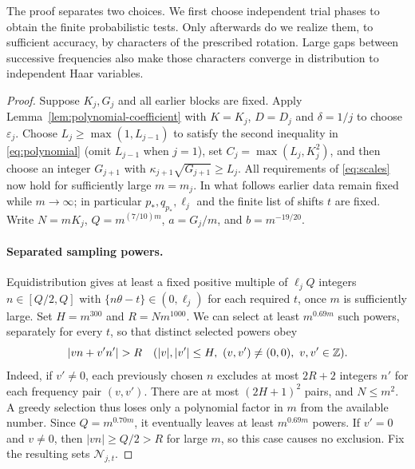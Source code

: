 The proof separates two choices.  We first choose independent trial
phases to obtain the finite probabilistic tests.  Only afterwards do
we realize them, to sufficient accuracy, by characters of the prescribed
rotation.  Large gaps between successive frequencies also make those
characters converge in distribution to independent Haar variables.

\begin{proof}
Suppose $K_j,G_j$ and all earlier blocks are fixed.  Apply
Lemma~\ref{lem:polynomial-coefficient} with $K=K_j$, $D=D_j$ and
$\delta=1/j$ to choose $\varepsilon_j$.
Choose $L_j\ge\max(1,L_{j-1})$ to satisfy the second inequality in \eqref{eq:polynomial}
(omit $L_{j-1}$ when $j=1$), set $C_j=\max(L_j,K_j^2)$, and then choose
an integer $G_{j+1}$ with $\kappa_{j+1}\sqrt{G_{j+1}}\ge L_j$.
All requirements of \eqref{eq:scales} now hold for sufficiently large
$m=m_j$.  In what follows earlier data remain fixed while $m\to\infty$;
in particular $p_*,q_{p_*},\ell_j$ and the finite list of shifts $t$ are
fixed.  Write $N=mK_j$, $Q=m^{(7/10)m}$, $a=G_j/m$, and
$b=m^{-19/20}$.

\paragraph{Separated sampling powers.}
Equidistribution gives at least a fixed positive multiple of $\ell_j Q$
integers $n\in[Q/2,Q]$ with $\{n\theta-t\}\in(0,\ell_j)$ for
each required $t$, once $m$ is sufficiently large.  Set
$H=m^{300}$ and $R=Nm^{1000}$.
We can select at least $m^{0.69m}$ such powers, separately for every $t$,
so that distinct selected powers obey
\begin{equation}\label{eq:power-separation}
 |vn+v'n'|>R\quad
 (|v|,|v'|\le H,\ (v,v')\ne(0,0),\ v,v'\in\Z).
\end{equation}
Indeed, if $v'\ne0$, each previously chosen $n$ excludes at most
$2R+2$ integers $n'$ for each frequency pair $(v,v')$.
There are at most $(2H+1)^2$ pairs, and $N\le m^2$.
A greedy selection thus loses only a polynomial factor in $m$ from the
available number.  Since $Q=m^{0.70m}$, it eventually leaves at least
$m^{0.69m}$ powers.  If $v'=0$ and $v\ne0$, then $|vn|\ge Q/2>R$
for large $m$, so this case causes no exclusion.  Fix the resulting
sets $\mathcal N_{j,t}$.


\end{proof}
